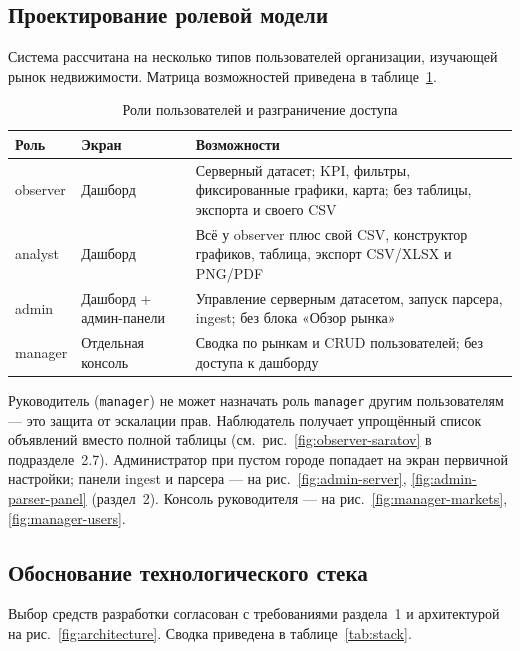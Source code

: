 \subsection{Проектирование ролевой модели}

Система рассчитана на несколько типов пользователей организации, изучающей рынок недвижимости. Матрица возможностей приведена в таблице~\ref{tab:roles}.

\begin{table}[htbp]
\centering
\small
\setlength{\tabcolsep}{3pt}
\begin{tabular}{|p{}|p{}|p{}|}
\hline
\textbf{Роль} & \textbf{Экран} & \textbf{Возможности} \\
\hline
observer & Дашборд & Серверный датасет; KPI, фильтры, фиксированные графики, карта; без таблицы, экспорта и своего CSV \\
\hline
analyst & Дашборд & Всё у observer плюс свой CSV, конструктор графиков, таблица, экспорт CSV/XLSX и PNG/PDF \\
\hline
admin & Дашборд + админ-панели & Управление серверным датасетом, запуск парсера, ingest; без блока «Обзор рынка» \\
\hline
manager & Отдельная консоль & Сводка по рынкам и CRUD пользователей; без доступа к дашборду \\
\hline
\end{tabular}
\caption{Роли пользователей и разграничение доступа}
\label{tab:roles}
\end{table}

Руководитель (\texttt{manager}) не может назначать роль \texttt{manager} другим пользователям --- это защита от эскалации прав. Наблюдатель получает упрощённый список объявлений вместо полной таблицы (см.~рис.~\ref{fig:observer-saratov} в подразделе~2.7). Администратор при пустом городе попадает на экран первичной настройки; панели ingest и парсера --- на рис.~\ref{fig:admin-server}, \ref{fig:admin-parser-panel} (раздел~2). Консоль руководителя --- на рис.~\ref{fig:manager-markets}, \ref{fig:manager-users}.



\subsection{Обоснование технологического стека}

Выбор средств разработки согласован с требованиями раздела~1 и архитектурой на рис.~\ref{fig:architecture}. Сводка приведена в таблице~\ref{tab:stack}.

